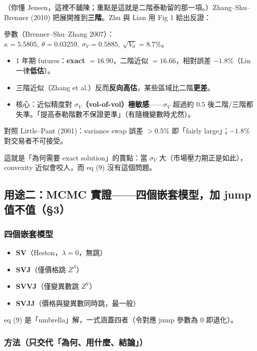 \documentclass[12pt, a4paper]{article}
\theoremstyle{remark}
\begin{document}
（你懂 Jensen，這裡不鋪陳；重點是這就是二階泰勒留的那一項。）Zhang--Shu--Brenner (2010) 把展開推到\textbf{三階}。Zhu 與 Lian 用 Fig 1 給出反證：

\begin{keybox}[title={Fig 1 的證據（純 SV，jump 參數全設 0）}]
參數（Brenner--Shu--Zhang 2007）：$\kappa=5.5805,\ \theta=0.03259,\ \sigma_V=0.5885,\ \sqrt{V_0}=8.7\%$。
\begin{itemize}[topsep=2pt, itemsep=1pt]
  \item 1 年期 futures：\textbf{exact $=16.90$}，二階近似 $=16.66$，相對誤差 $\mathbf{-1.8\%}$（Lin 一律\textbf{低估}）。
  \item 三階近似（Zhang et al.）反而\textbf{反向高估}，某些區域比二階\textbf{更差}。
  \item 核心：近似精度對 \textbf{$\sigma_V$（vol-of-vol）極敏感}——$\sigma_V$ 超過約 $0.5$ 後二階/三階都失準。「提高泰勒階數不保證更準」（有隨機變數時尤然）。
\end{itemize}
對照 Little--Pant (2001)：variance swap 誤差 $>0.5\%$ 即「fairly large」；$-1.8\%$ 對交易者不可接受。
\end{keybox}

這就是「為何需要 exact solution」的賣點：當 $\sigma_V$ 大（市場壓力期正是如此），convexity 近似會咬人，而 eq (9) 沒有這個問題。

\subsection{用途二：MCMC 實證——四個嵌套模型，加 jump 值不值（§3）}

\subsubsection*{四個嵌套模型}

\begin{itemize}[topsep=2pt, itemsep=1pt]
  \item \textbf{SV}（Heston，$\lambda=0$，無跳）
  \item \textbf{SVJ}（僅價格跳 $Z^S$）
  \item \textbf{SVVJ}（僅變異數跳 $Z^V$）
  \item \textbf{SVJJ}（價格與變異數同時跳，最一般）
\end{itemize}

eq (9) 是「umbrella」解，一式涵蓋四者（令對應 jump 參數為 0 即退化）。

\subsubsection*{方法（只交代「為何、用什麼、結論」）}
\end{document}
